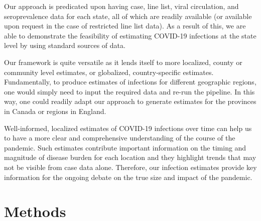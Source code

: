 \documentclass{article}
\newcommand{\attn}[1]{\textcolor{red}{ATTN: #1}}
\begin{document}
Our approach is predicated upon having case, line list, viral circulation, and seroprevalence data for each state, all of which are readily available (or available upon request in the case of restricted line list data). As a result of this, we are able to demonstrate the feasibility of estimating COVID-19 infections at the state level by using standard sources of data. 

Our framework is quite versatile as it lends itself to more localized, county or community level estimates, or globalized, country-specific estimates. Fundamentally, to produce estimates of infections for different geographic regions, one would simply need to input the required data and re-run the pipeline. In this way, one could readily adapt our approach to generate estimates for the provinces in Canada or regions in England.

Well-informed, localized estimates of COVID-19 infections over time can help us to have a more clear and comprehensive understanding of the course of the pandemic. Such estimates contribute important information on the timing and magnitude of disease burden for each location and they highlight trends that may not be visible from case data alone. Therefore, our infection estimates provide key information for the ongoing debate on the true size and impact of the pandemic.

\section{Methods}

\end{document}
